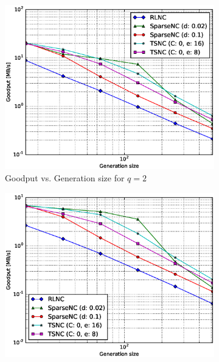 \begin{figure}
    \centering
    \begin{subfigure}[b]{0.475\textwidth}
        \centering
        \includegraphics[width=1.15\textwidth]{images/06_06_2016/goodput_vs_generation_size_Rasp_decoder_Binary_1600.eps}
        \caption[]%
        {{\small Goodput vs. Generation size for $q = 2$}}
        \label{fig:dec_good_rasp1_gen_gf2}
    \end{subfigure}
    \hfill
    \begin{subfigure}[b]{0.475\textwidth}
        \centering
        \includegraphics[width=1.15\textwidth]{images/06_06_2016/goodput_vs_generation_size_Rasp_decoder_Binary8_1600.eps}

\end{subfigure}
\end{figure}
